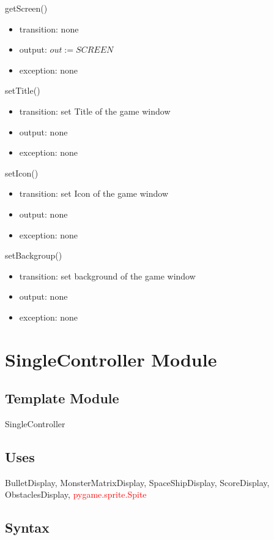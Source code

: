 \documentclass[12pt]{article}
\begin{document}
\noindent getScreen()
\begin{itemize}
\item transition: none
\item output: $out := SCREEN$
\item exception: none
\end{itemize}

\noindent setTitle()
\begin{itemize}
\item transition: set Title of the game window
\item output: none
\item exception: none
\end{itemize}

\noindent setIcon()
\begin{itemize}
\item transition: set Icon of the game window
\item output: none
\item exception: none
\end{itemize}

\noindent setBackgroup()
\begin{itemize}
\item transition: set background of the game window
\item output: none
\item exception: none
\end{itemize}

\newpage

\section{SingleController Module}

\subsection*{Template Module}
SingleController

\subsection*{Uses}
BulletDisplay, MonsterMatrixDisplay, SpaceShipDisplay, ScoreDisplay,
ObstaclesDisplay, \textcolor{red}{pygame.sprite.Spite}

\subsection*{Syntax}
\end{document}
